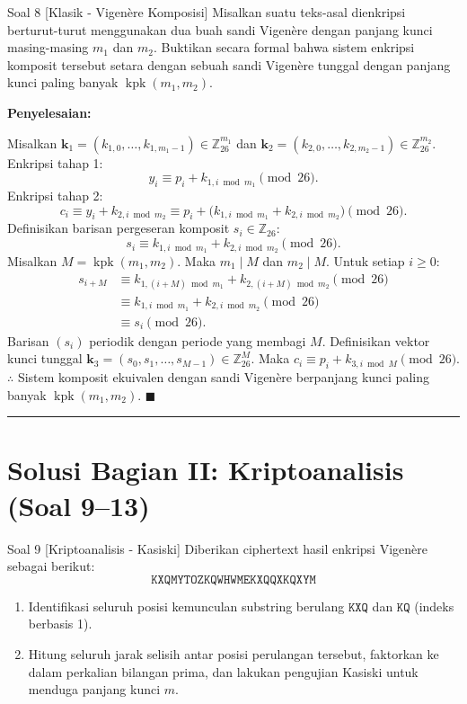 \documentclass[11pt,a4paper]{article}
\newenvironment{solusi}{\noindent\textbf{\textsf{Penyelesaian:}}\par\vspace{0.2em}}{\hfill$\blacksquare$\vspace{1em}\par\hrule\vspace{1em}}
\begin{document}
\begin{soalklasik}{Soal 8 [Klasik - Vigenère Komposisi]}
Misalkan suatu teks-asal dienkripsi berturut-turut menggunakan dua buah sandi Vigenère dengan panjang kunci masing-masing $m_1$ dan $m_2$.
Buktikan secara formal bahwa sistem enkripsi komposit tersebut setara dengan sebuah sandi Vigenère tunggal dengan panjang kunci paling banyak $\operatorname{kpk}(m_1, m_2)$.
\end{soalklasik}

\begin{solusi}
Misalkan $\mathbf{k}_1 = (k_{1, 0}, \dots, k_{1, m_1-1}) \in \mathbb{Z}_{26}^{m_1}$ dan $\mathbf{k}_2 = (k_{2, 0}, \dots, k_{2, m_2-1}) \in \mathbb{Z}_{26}^{m_2}$.
Enkripsi tahap 1:
\[
y_i \equiv p_i + k_{1, i \bmod m_1} \pmod{26}.
\]
Enkripsi tahap 2:
\[
c_i \equiv y_i + k_{2, i \bmod m_2} \equiv p_i + \big(k_{1, i \bmod m_1} + k_{2, i \bmod m_2}\big) \pmod{26}.
\]
Definisikan barisan pergeseran komposit $s_i \in \mathbb{Z}_{26}$:
\[
s_i \equiv k_{1, i \bmod m_1} + k_{2, i \bmod m_2} \pmod{26}.
\]
Misalkan $M = \operatorname{kpk}(m_1, m_2)$. Maka $m_1 \mid M$ dan $m_2 \mid M$.
Untuk setiap $i \ge 0$:
\begin{align*}
s_{i + M} &\equiv k_{1, (i + M) \bmod m_1} + k_{2, (i + M) \bmod m_2} \pmod{26} \\
&\equiv k_{1, i \bmod m_1} + k_{2, i \bmod m_2} \pmod{26} \\
&\equiv s_i \pmod{26}.
\end{align*}
Barisan $(s_i)$ periodik dengan periode yang membagi $M$.
Definisikan vektor kunci tunggal $\mathbf{k}_3 = (s_0, s_1, \dots, s_{M-1}) \in \mathbb{Z}_{26}^M$.
Maka $c_i \equiv p_i + k_{3, i \bmod M} \pmod{26}$.
$\therefore$ Sistem komposit ekuivalen dengan sandi Vigenère berpanjang kunci paling banyak $\operatorname{kpk}(m_1, m_2)$.
\end{solusi}

\newpage
\section{Solusi Bagian II: Kriptoanalisis (Soal 9--13)}

\begin{soalanalisis}{Soal 9 [Kriptoanalisis - Kasiski]}
Diberikan ciphertext hasil enkripsi Vigenère sebagai berikut:
\[
\texttt{KXQMYTOZKQWHWMEKXQQXKQXYM}
\]
\begin{enumerate}[label=(\alph*)]
    \item Identifikasi seluruh posisi kemunculan substring berulang $\texttt{KXQ}$ dan $\texttt{KQ}$ (indeks berbasis 1).
    \item Hitung seluruh jarak selisih antar posisi perulangan tersebut, faktorkan ke dalam perkalian bilangan prima, dan lakukan pengujian Kasiski untuk menduga panjang kunci $m$.
\end{enumerate}
\end{soalanalisis}
\end{document}
